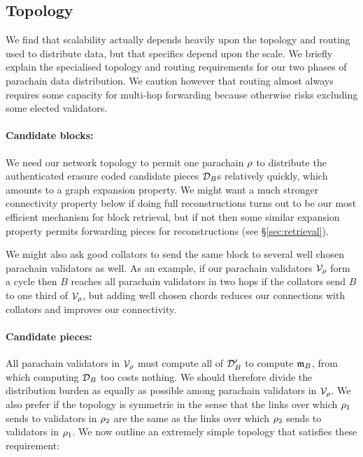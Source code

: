 \subsection{Topology}
\label{sec:topology}

We find that scalability actually depends heavily upon the topology and routing used to distribute data, but that specifics depend upon the scale.  We briefly explain the specialised topology and routing requirements for our two phases of parachain data distribution.  We caution however that routing almost always requires some capacity for multi-hop forwarding because otherwise risks excluding some elected validators.  

\smallskip
\paragraph{Candidate blocks:}

We need our network topology to permit one parachain $\rho$ to distribute the authenticated erasure coded candidate pieces $\mathcal{D}_B$s relatively quickly, which amounts to a graph expansion property.  We might want a much stronger connectivity property below if doing full reconstructions turns out to be our most efficient mechanism for block retrieval, but if not then some similar expansion property permits forwarding pieces for reconstructions (see \S\ref{sec:retrieval}).

We might also ask good collators to send the same block to several well chosen parachain validators as well.  As an example, if our parachain validators $\mathcal{V}_{\rho}$ form a cycle then $B$ reaches all parachain validators in two hops if the collators send $B$ to one third of $\mathcal{V}_{\rho}$, but adding well chosen chords reduces our connections with collators and improves our connectivity.  

\smallskip
\paragraph{Candidate pieces:}

All parachain validators in $\mathcal{V}_{\rho}$ must compute all of $\mathcal{D}'_B$ to compute $\mathfrak{m}_B$, from which computing $\mathcal{D}_B$ too costs nothing.  We should therefore divide the distribution burden as equally as possible among parachain validators in $\mathcal{V}_{\rho}$.  We also prefer if the topology is symmetric in the sense that the links over which $\rho_1$ sends to validators in $\rho_2$ are the same as the links over which $\rho_2$ sends to validators in $\rho_1$.  We now outline an extremely simple topology that satisfies these requirement:

